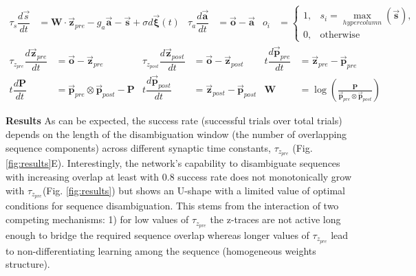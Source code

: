\documentclass[12pt, a4paper]{article}
\begin{document}
\begin{align}
\tau_s \dfrac{d \vec{s}}{dt} &=  \mathbf{W} \cdot \vec{\mathbf{z}}_{pre}  - g_a \vec{\mathbf{a}} - \vec{\mathbf{s}}  + \sigma d\vec{\mathbf{\xi}}(t)  
  &\tau_a \dfrac{d\vec{\mathbf{a}}}{dt} &= \vec{\mathbf{o}} - \vec{\mathbf{a}} 
   &o_i &=   \begin{cases}
       1,&  s_i = \underset{hypercolumn}{\max}(\vec{\mathbf{s}}),\\
       0 ,& \text{otherwise}
    \end{cases} \label{eq:dynamics}
\end{align}
\begin{align}
\tau_{z_{pre}} \dfrac{d\vec{\mathbf{\mathbf{z}}}_{pre}}{dt} &= \vec{\mathbf{o}} - \vec{\mathbf{z}}_{pre} 
 & \tau_{z_{post}} \dfrac{d \vec{\mathbf{z}}_{post}}{dt} &= \vec{\mathbf{o}} - \vec{\mathbf{z}}_{post} 
& t \dfrac{d \vec{\mathbf{p}}_{pre}}{dt} &= \vec{\mathbf{z}}_{pre} - \vec{\mathbf{p}}_{pre}  
 \nonumber \\
 t\dfrac{d\mathbf{P}}{dt} &= \vec{\mathbf{p}}_{pre} \otimes \vec{\mathbf{p}}_{post} -\mathbf{P}  
 &t\dfrac{d\vec{\mathbf{p}}_{post}}{dt} &= \vec{\mathbf{z}}_{post} - \vec{\mathbf{p}}_{post}   
 &\mathbf{W} &= \log \left(\frac{\mathbf{P}}{\vec{\mathbf{p}}_{pre} \otimes \vec{\mathbf{p}}_{post}} \right)   \label{eq:learning}
\end{align}

\textbf{Results}
As can be expected, the success rate (successful trials over total trials) depends on the length of the disambiguation window (the number of overlapping sequence components) across different synaptic time constants, $\tau_{z_{pre}}$ (Fig. \ref{fig:results}E). Interestingly, the network’s capability to disambiguate sequences with increasing overlap at least with $0.8$ success rate does not monotonically grow with $\tau_{z_{pre}}$(Fig. \ref{fig:results}) but shows an U-shape with a limited value of optimal conditions for sequence disambiguation. This stems from the interaction of two competing mechanisms: 1) for low values of $\tau_{z_{pre}}$ the z-traces are not active long enough to bridge the required sequence overlap whereas longer values of $\tau_{z_{pre}}$ lead to non-differentiating learning among the sequence (homogeneous weights structure). 
\end{document}
